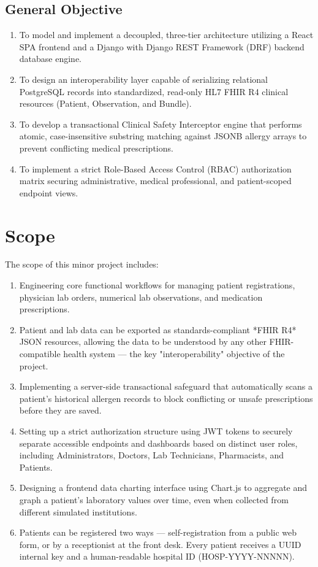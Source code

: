 \documentclass[12pt, a4paper]{report}
\numberwithin{equation}{chapter}
\begin{document}
\subsection{General Objective}
\begin{enumerate}[label=\Roman*.]
    \item To model and implement a decoupled, three-tier architecture utilizing a React SPA frontend and a Django with Django REST Framework (DRF) backend database engine.
    \item To design an interoperability layer capable of serializing relational PostgreSQL records into standardized, read-only HL7 FHIR R4 clinical resources (Patient, Observation, and Bundle).
    \item To develop a transactional Clinical Safety Interceptor engine that performs atomic, case-insensitive substring matching against JSONB allergy arrays to prevent conflicting medical prescriptions.
    \item To implement a strict Role-Based Access Control (RBAC) authorization matrix securing administrative, medical professional, and patient-scoped endpoint views.
    
   
\end{enumerate}
\clearpage
\section{Scope}
The scope of this minor project includes:

\begin{enumerate}[label=\Roman*.]
  \item Engineering core functional workflows for managing patient registrations, physician lab orders, numerical lab observations, and medication prescriptions.
  \item Patient and lab data can be exported as standards-compliant *FHIR R4* JSON resources, allowing the data to be understood by any other FHIR-compatible health system — the key "interoperability" objective of the project.
  \item Implementing a server-side transactional safeguard that automatically scans a patient's historical allergen records to block conflicting or unsafe prescriptions before they are saved.
  \item Setting up a strict authorization structure using JWT tokens to securely separate accessible endpoints and dashboards based on distinct user roles, including Administrators, Doctors, Lab Technicians, Pharmacists, and Patients.
  \item Designing a frontend data charting interface using Chart.js to aggregate and graph a patient's laboratory values over time, even when collected from different simulated institutions.
  \item Patients can be registered two ways — self-registration from a public web form, or by a receptionist at the front desk. Every patient receives a UUID internal key and a human-readable hospital ID (HOSP-YYYY-NNNNN).
\end{enumerate}
\end{document}
